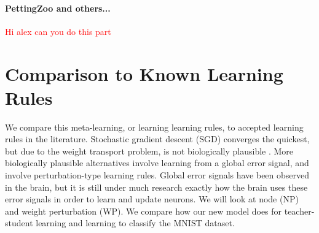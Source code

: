 \documentclass{article}
\begin{document}
\paragraph{PettingZoo and others...} \textcolor{red}{Hi alex can you do this part}

\section{Comparison to Known Learning Rules}

We compare this meta-learning, or learning learning rules, to accepted learning rules in the literature. Stochastic gradient descent (SGD) converges the quickest, but due to the weight transport problem, is not biologically plausible \cite{mazzoni1991}. More biologically plausible alternatives involve learning from a global error signal, and involve perturbation-type learning rules. Global error signals have been observed in the brain, but it is still under much research exactly how the brain uses these error signals in order to learn and update neurons. We will look at node (NP) and weight perturbation (WP). We compare how our new model does for teacher-student learning and learning to classify the MNIST dataset.
\end{document}
